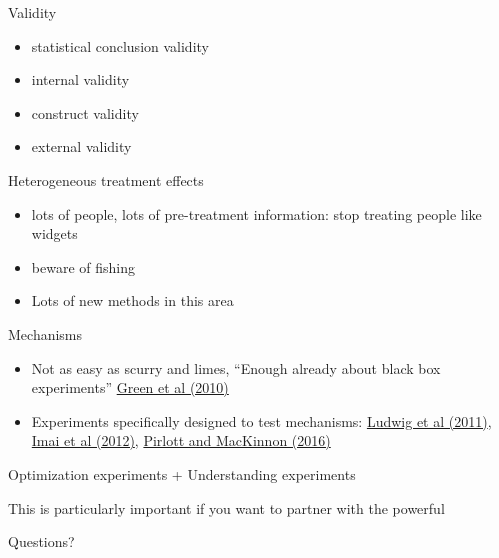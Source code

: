 \documentclass[aspectratio=169]{beamer}
\begin{document}
\begin{frame}

Validity
\begin{itemize}
\item statistical conclusion validity
\item internal validity
\item construct validity
\item external validity
\end{itemize}

\end{frame}
\begin{frame}

Heterogeneous treatment effects 
\begin{itemize}
\item lots of people, lots of pre-treatment information: stop treating people like widgets
\pause
\item beware of fishing
\pause
\item Lots of new methods in this area
\end{itemize}

\end{frame}
\begin{frame}

Mechanisms
\begin{itemize}
\item Not as easy as scurry and limes, ``Enough already about black box experiments''  \textcolor{blue}{\href{http://dx.doi.org/10.1177/0002716209351526}{Green et al (2010)}}
\pause
\item Experiments specifically designed to test mechanisms: \textcolor{blue}{\href{http://dx.doi.org/10.1257/jep.25.3.17}{Ludwig et al (2011)}}, \textcolor{blue}{\href{http://dx.doi.org/10.1111/j.1467-985X.2012.01032.x}{Imai et al (2012)}}, \textcolor{blue}{\href{http://dx.doi.org/10.1016/j.jesp.2015.09.012}{Pirlott and MacKinnon (2016)}}
\end{itemize}

\end{frame}
\begin{frame}

\Large{
\begin{center}
Optimization experiments + Understanding experiments
\end{center}
}

\pause
This is particularly important if you want to partner with the powerful

\end{frame}
\begin{frame}

\Large{
\begin{center}
Questions?
\end{center}
}

\end{frame}
\end{document}
